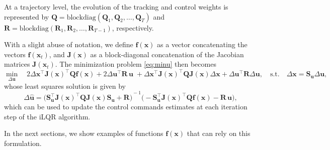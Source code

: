 \documentclass[10pt,a4paper]{article} %
\newcommand{\trsp}{{\scriptscriptstyle\top}}
\begin{document}
At a trajectory level, the evolution of the tracking and control weights is represented by $\bm{Q}\!=\!\mathrm{blockdiag}(\bm{Q}_1,\bm{Q}_2,\ldots,\bm{Q}_T)$ and $\bm{R}\!=\!\mathrm{blockdiag}(\bm{R}_{1},\bm{R}_{2},\ldots,\bm{R}_{T-1})$, respectively.  %

With a slight abuse of notation, we define $\bm{f}(\bm{x})$ as a vector concatenating the vectors $\bm{f}(\bm{x}_t)$, and $\bm{J}(\bm{x})$ as a block-diagonal concatenation of the Jacobian matrices $\bm{J}(\bm{x}_t)$. The minimization problem \eqref{eq:minu} then becomes
\begin{equation}
	\min_{\Delta\bm{u}} \quad 2 \Delta\bm{x}^{\!\trsp} \bm{J}(\bm{x})^\trsp \bm{Q} \bm{f}(\bm{x}) + 2 \Delta\bm{u}^{\!\trsp} \bm{R} \, \bm{u} \; + 
	\Delta\bm{x}^{\!\trsp} \bm{J}(\bm{x})^\trsp \bm{Q} \bm{J}(\bm{x}) \Delta\bm{x} + \Delta\bm{u}^{\!\trsp} \bm{R} \Delta\bm{u}, 
	\quad \text{s.t.} \quad \Delta\bm{x} = \bm{S}_{\bm{u}} \Delta\bm{u},
\end{equation}
whose least squares solution is given by
\begin{equation}
	\Delta\bm{\hat{u}} \!=\! {\Big(\bm{S}_{\bm{u}}^\trsp \bm{J}(\bm{x})^\trsp \bm{Q} \bm{J}(\bm{x}) \bm{S}_{\bm{u}} \!+\! \bm{R}\Big)}^{\!\!-1} 
	\Big(- \bm{S}_{\bm{u}}^\trsp \bm{J}(\bm{x})^\trsp \bm{Q} \bm{f}(\bm{x}) - \bm{R} \, \bm{u} \Big),
	\label{eq:du}
\end{equation}
which can be used to update the control commands estimates at each iteration step of the iLQR algorithm.

In the next sections, we show examples of functions $\bm{f}(\bm{x})$ that can rely on this formulation.

\end{document}
